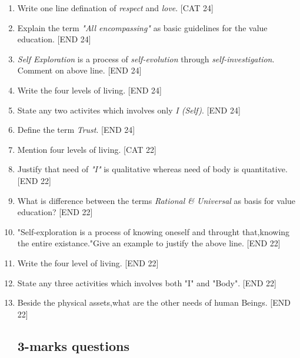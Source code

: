 \documentclass[12pt]{article}
\begin{document}
\begin{enumerate}
		\item Write one line defination of \textit{respect} and \textit{love}. \hfill{[CAT 24]}
		
		\item Explain the term \textit{"All encompassing"} as basic guidelines for the value education. \hfill{[END 24]}
		
		\item \textit{Self Exploration} is a process of \textit{self-evolution} through \textit{self-investigation}. Comment on above line. \hfill{[END 24]}
		
		\item Write the four levels of living. \hfill{[END 24]}
		
		\item State any two activites which involves only \textit{I (Self)}. \hfill{[END 24]}
		
		\item Define the term \textit{Trust}. \hfill{[END 24]}
		
		\item Mention four levels of living. \hfill{[CAT 22]}
		
		\item Justify that need of \textit{"I"} is qualitative whereas need of body is quantitative. \hfill{[END 22]}
		
		\item What is difference between the terms \textit{Rational \& Universal} as basis for value education? \hfill{[END 22]}
		
		\item "Self-exploration is a process of knowing oneself and throught that,knowing the entire existance."Give an example to justify the above line. \hfill{[END 22]}
		
		\item Write the four level of living. \hfill{[END 22]}
		
		\item State any three activities which involves both "I" and "Body". \hfill{[END 22]}
		
		\item Beside the physical assets,what are the other needs of human Beings. \hfill{[END 22]}
		
		
		
		\subsection{3-marks questions}
		

\end{enumerate}
\end{document}
